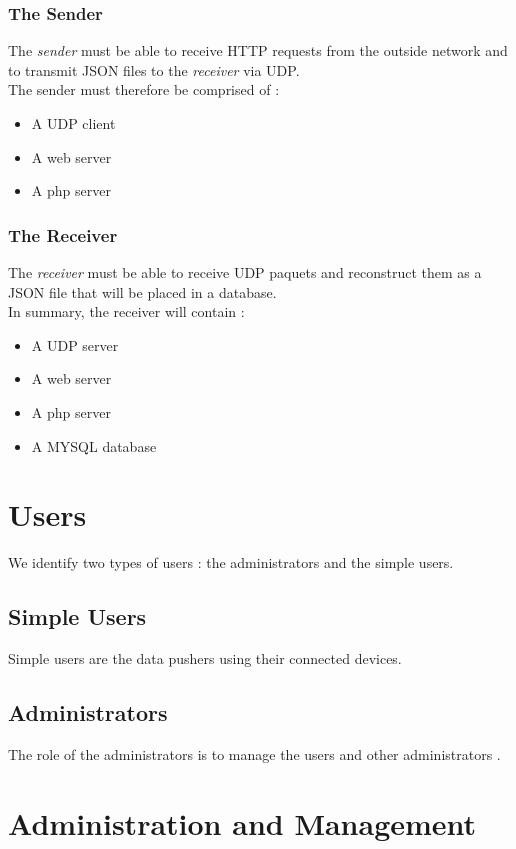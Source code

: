 \documentclass[a4paper,11pt]{article}
\begin{document}
\subsubsection{The Sender}
The \textit{sender} must be able to receive HTTP requests from the outside network and to transmit JSON files to the \textit{receiver} via UDP.\\

The sender must therefore be comprised of :
\begin{itemize}
\item{A UDP client}
\item{A web server}
\item{A php server}
\end{itemize} 

\subsubsection{The Receiver}
The \textit{receiver} must be able to receive UDP paquets and reconstruct them as a JSON file that will be placed in a database. \\

In summary, the receiver will contain :
\begin{itemize}
\item{A UDP server}
\item{A web server}
\item{A php server}
\item{A MYSQL database}
\end{itemize}

\section{Users}
We identify two types of users : the administrators and the simple users.

\subsection{Simple Users}
Simple users are the data pushers using their connected devices.
\subsection{Administrators}
The role of the administrators is to manage the users and other administrators .
\section{Administration and Management}
\end{document}
